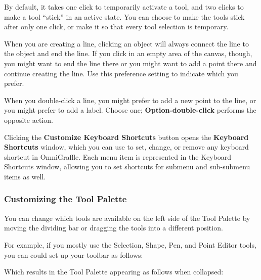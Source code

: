 \documentclass[../main.tex]{subfiles}
\begin{document}

\begin{description}[style=nextline]
  \item[{Keep tool active}] By default, it takes one click to temporarily activate a tool, and
    two clicks to make a tool ``stick'' in an active state. You can choose to make the tools
    stick after only one click, or make it so that every tool selection is temporary.
  \item[{Line Creation}] When you are creating a line, clicking an object will always connect
    the line to the object and end the line. If you click in an empty area of the canvas,
    though, you might want to end the line there or you might want to add a point there and
    continue creating the line. Use this preference setting to indicate which you prefer.
  \item[{Line Editing}] When you double-click a line, you might prefer to add a new point to the
    line, or you might prefer to add a label. Choose one; \textbf{Option-double-click} performs
    the opposite action.
\end{description}

Clicking the \textbf{Customize Keyboard Shortcuts} button opens the \textbf{Keyboard Shortcuts}
window, which you can use to set, change, or remove any keyboard shortcut in OmniGraffle. Each
menu item is represented in the Keyboard Shortcuts window, allowing you to set shortcuts for
submenu and sub-submenu items as well.

\subsubsection{Customizing the Tool Palette}

You can change which tools are available on the left side of the Tool Palette by moving the
dividing bar or dragging the tools into a different position.


For example, if you mostly use the Selection, Shape, Pen, and Point Editor tools, you can could
set up your toolbar as follows:


Which results in the Tool Palette appearing as follows when collapsed:

\end{document}
